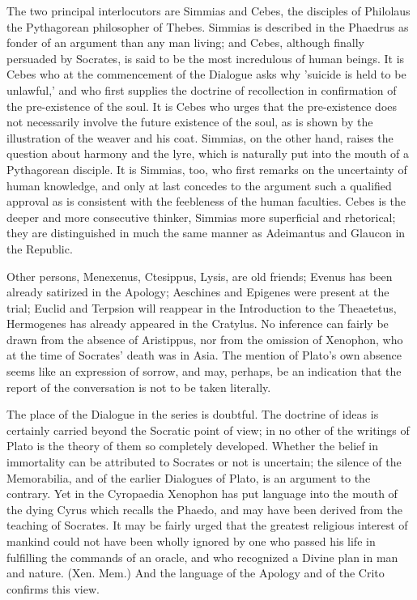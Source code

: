 \documentclass[11pt,letter]{article}
\begin{document}
\par  The two principal interlocutors are Simmias and Cebes, the disciples of Philolaus the Pythagorean philosopher of Thebes. Simmias is described in the Phaedrus as fonder of an argument than any man living; and Cebes, although finally persuaded by Socrates, is said to be the most incredulous of human beings. It is Cebes who at the commencement of the Dialogue asks why 'suicide is held to be unlawful,' and who first supplies the doctrine of recollection in confirmation of the pre-existence of the soul. It is Cebes who urges that the pre-existence does not necessarily involve the future existence of the soul, as is shown by the illustration of the weaver and his coat. Simmias, on the other hand, raises the question about harmony and the lyre, which is naturally put into the mouth of a Pythagorean disciple. It is Simmias, too, who first remarks on the uncertainty of human knowledge, and only at last concedes to the argument such a qualified approval as is consistent with the feebleness of the human faculties. Cebes is the deeper and more consecutive thinker, Simmias more superficial and rhetorical; they are distinguished in much the same manner as Adeimantus and Glaucon in the Republic.

\par  Other persons, Menexenus, Ctesippus, Lysis, are old friends; Evenus has been already satirized in the Apology; Aeschines and Epigenes were present at the trial; Euclid and Terpsion will reappear in the Introduction to the Theaetetus, Hermogenes has already appeared in the Cratylus. No inference can fairly be drawn from the absence of Aristippus, nor from the omission of Xenophon, who at the time of Socrates' death was in Asia. The mention of Plato's own absence seems like an expression of sorrow, and may, perhaps, be an indication that the report of the conversation is not to be taken literally.

\par  The place of the Dialogue in the series is doubtful. The doctrine of ideas is certainly carried beyond the Socratic point of view; in no other of the writings of Plato is the theory of them so completely developed. Whether the belief in immortality can be attributed to Socrates or not is uncertain; the silence of the Memorabilia, and of the earlier Dialogues of Plato, is an argument to the contrary. Yet in the Cyropaedia Xenophon has put language into the mouth of the dying Cyrus which recalls the Phaedo, and may have been derived from the teaching of Socrates. It may be fairly urged that the greatest religious interest of mankind could not have been wholly ignored by one who passed his life in fulfilling the commands of an oracle, and who recognized a Divine plan in man and nature. (Xen. Mem.) And the language of the Apology and of the Crito confirms this view.
\end{document}
